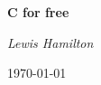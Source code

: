 \documentclass{article}
\begin{document}
\begin{titlepage}
    \centering
    \vspace{1.5cm}
    {\huge\bfseries C for free \par}
    \vspace{2cm}
    {\Large\itshape Lewis Hamilton\\}


    {\large \today\par}
\end{titlepage}



\end{document}
